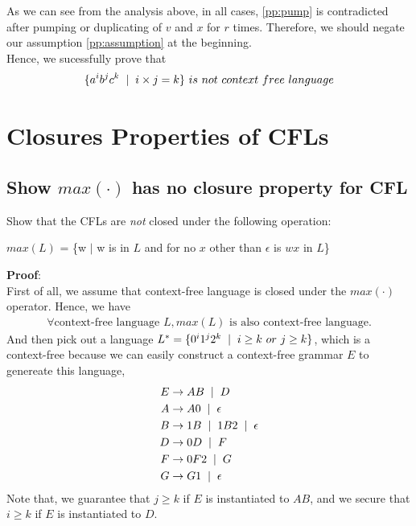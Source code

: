 \documentclass[11pt,a4paper]{article}
\newcommand{\htab}{\hspace*{0.63cm}}
\newcommand{\ba}{\hspace*{0.2cm} | \hspace*{0.2cm}}
\newcommand{\LL}{L^{*}}
\begin{document}
\htab As we can see from the analysis above, in all cases, \eqref{pp:pump}
is contradicted after pumping or duplicating of $v$ and $x$ for $r$ times.
Therefore, we should negate our assumption \eqref{pp:assumption} at the beginning.\\
\htab Hence, we sucessfully prove that 
\begin{equation} \{ a^{i} b^{j} c^{k} \ba i \times j = k \} \ is \ not \ context\ free\ language \end{equation}
\newpage

\section{Closures Properties of CFLs}
\subsection{Show $max(\cdot)$ has no closure property for CFL}
\htab Show that the CFLs are \textit{not} closed under the following operation:
\begin{center}
    $max(L)$ = \{w $|$ w is in $L$ and for no $x$ other than $\epsilon$ is $wx$ in $L$\}
\end{center}
\htab \textbf{Proof}: \\
\htab First of all, we assume that context-free language is closed under the $max(\cdot)$ operator. 
Hence, we have 
\begin{align}
    \forall \text{context-free language } L, max(L) \text{ is also context-free language.}
    \label{6:assumeClosure}
\end{align}
\htab And then pick out a language $\LL = \{0^{i}1^{j}2^{k} \ba i \geq k\ or\ j \geq k\}$, which is a context-free
because we can easily construct a context-free grammar $E$ to genereate this language, 
\begin{align}
    E &\rightarrow AB \ba D \\
    A &\rightarrow A0 \ba \epsilon \\
    B &\rightarrow 1B \ba 1B2 \ba \epsilon \\
    D &\rightarrow 0D \ba F \\
    F &\rightarrow 0F2 \ba G \\
    G &\rightarrow G1 \ba \epsilon 
    \end{align}
\htab Note that, we guarantee that $j \geq k$ if $E$ is instantiated to $AB$, 
and we secure that $i \geq k$ if $E$ is instantiated to $D$. \\
\end{document}
